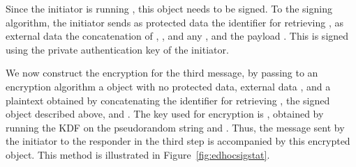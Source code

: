 {Since the initiator is running \mSig, this \mCose{} object needs to be signed. To the signing algorithm, the initiator sends as protected data the identifier for retrieving \mCredi, as external data the concatenation of \mTHthree, \mCredi, and any \mADthree, and the payload \mMacthree. This is signed using the private authentication key of the initiator.  

We now construct the encryption for the third message, by passing to an \mAead{} encryption algorithm a \mCose{} object with no protected data, external data \mTHthree, and a plaintext obtained by concatenating the identifier for retrieving \mCredi, the signed object described above, and \mADthree. The key used for encryption is \mKthreeae, obtained by running the KDF on the pseudorandom string \mPRKthree and \mTHtwo. Thus, the message sent by the initiator to the responder in the third step is \mCr accompanied by this encrypted object. This method is illustrated in Figure~\ref{fig:edhocsigstat}.

}
